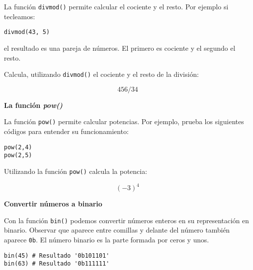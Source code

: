 \documentclass[a4paper, 11pt]{scrartcl}
\newenvironment{code}{\begin{tcolorbox}[colback=red!2!white]}{\end{tcolorbox}}
\begin{document}
La función \verb|divmod()| permite calcular el cociente y el resto. Por ejemplo si tecleamos:

\smallskip

\begin{code}

\begin{verbatim}
divmod(43, 5)
\end{verbatim}

\end{code}

el resultado es una pareja de números. El primero es cociente y el segundo el resto.

Calcula, utilizando \verb|divmod()| el cociente y el resto de la división:

$$
456 / 34
$$






\noindent\textbf{\sffamily \dag{} La función \textit{pow()}}


La función \verb|pow()| permite calcular potencias. Por ejemplo, prueba los siguientes códigos para entender su funcionamiento:

\smallskip

\begin{code}

\begin{verbatim}
pow(2,4)
pow(2,5)
\end{verbatim}

\end{code}



Utilizando la función \verb|pow()| calcula la potencia:

$$
(-3)^4
$$






\noindent\textbf{\sffamily \dag{}  Convertir números a binario}

Con la función \verb|bin()| podemos convertir números enteros en su representación en binario. Observar que aparece entre comillas y delante del número también aparece \verb|0b|. El número binario es la parte formada por ceros y unos.

\smallskip

\begin{code}

\begin{verbatim}
bin(45) # Resultado '0b101101'
bin(63) # Resultado '0b111111'
\end{verbatim}

\end{code}
\end{document}
